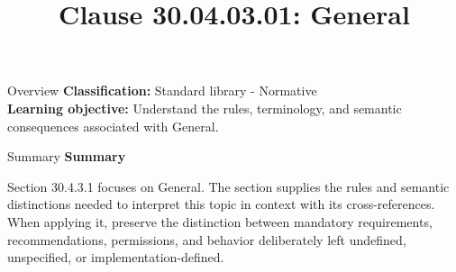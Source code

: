 \documentclass[10pt,letterpaper]{article}
\title{Clause 30.04.03.01: General}
\author{}
\date{}
\begin{document}
\maketitle
\begin{CornellOverviewBox}{Overview}
\textbf{Classification:} Standard library - Normative\\[2pt]
\textbf{Learning objective:} Understand the rules, terminology, and semantic consequences associated with General.
\end{CornellOverviewBox}\begin{CornellSummaryBox}{Summary}
{\sffamily\bfseries\color{Accent} Summary}\par\vspace{3pt}Section 30.4.3.1 focuses on General. The section supplies the rules and semantic distinctions needed to interpret this topic in context with its cross-references. When applying it, preserve the distinction between mandatory requirements, recommendations, permissions, and behavior deliberately left undefined, unspecified, or implementation-defined.
\end{CornellSummaryBox}
\end{document}
